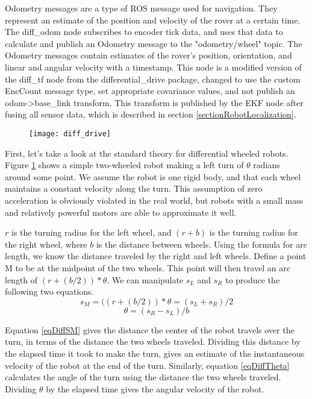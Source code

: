 Odometry messages are a type of ROS message used for navigation. They represent an estimate of the position and velocity of the rover at a certain time. The diff\_odom node subscribes to encoder tick data, and uses that data to calculate and publish an Odometry message to the "odometry/wheel" topic. The Odometry messages contain estimates of the rover's position, orientation, and linear and angular velocity with a timestamp. This node is a modified version of the diff\_tf node from the differential\_drive package, changed to use the custom EncCount message type, set appropriate covariance values, and not publish an odom->base\_link transform. This transform is published by the EKF node after fusing all sensor data, which is described in section \ref{sectionRobotLocalization}.

\begin{figure}[h]
	\caption{\cite{differentialSteeringPaper}}
	\centering
	\texttt{[image: diff\_drive]}
	\label{figDiffDrive}
\end{figure}

First, let's take a look at the standard theory for differential wheeled robots. Figure \ref{figDiffDrive} shows a simple two-wheeled robot making a left turn of \(\theta\) radians around some point. We assume the robot is one rigid body, and that each wheel maintains a constant velocity along the turn. This assumption of zero acceleration is obviously violated in the real world, but robots with a small mass and relatively powerful motors are able to approximate it well. \cite{differentialSteeringPaper}

\(r\) is the turning radius for the left wheel, and \((r+b)\) is the turning radius for the right wheel, where \(b\) is the distance between wheels. Using the formula for arc length, we know the distance traveled by the right and left wheels. Define a point M to be at the midpoint of the two wheels. This point will then travel an arc length of \((r+(b/2)) * \theta \). We can manipulate \(s_L\) and \(s_R\) to produce the following two equations.
\begin{equation} \label{eqDiffSM}
s_M = ((r+(b/2)) * \theta = (s_L + s_R) / 2
\end{equation}
\begin{equation} \label{eqDiffTheta}
\theta = (s_R - s_L) / b
\end{equation}

Equation \ref{eqDiffSM} gives the distance the center of the robot travels over the turn, in terms of the distance the two wheels traveled. Dividing this distance by the elapsed time it took to make the turn, gives an estimate of the instantaneous velocity of the robot at the end of the turn. Similarly, equation \ref{eqDiffTheta} calculates the angle of the turn using the distance the two wheels traveled. Dividing \(\theta\) by the elapsed time gives the angular velocity of the robot.

